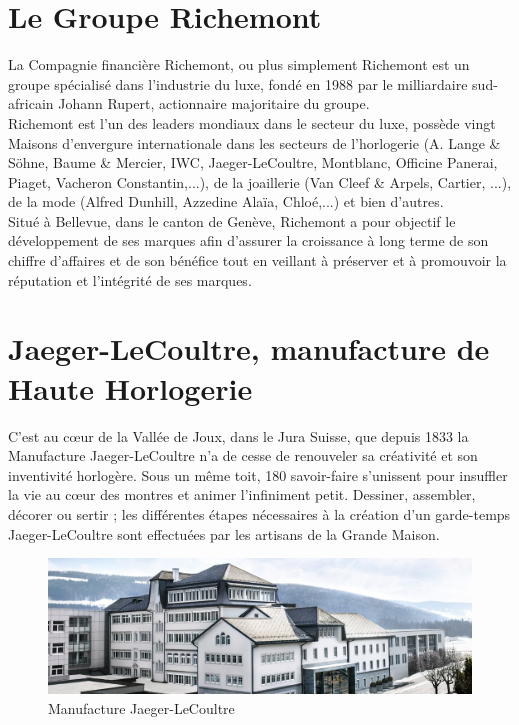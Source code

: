 \section{Le Groupe Richemont}
La Compagnie financière Richemont, ou plus simplement Richemont est un groupe spécialisé dans l'industrie du luxe, fondé en 1988 par le milliardaire sud-africain Johann Rupert, actionnaire majoritaire du groupe. \\

Richemont est l’un des leaders mondiaux dans le secteur du luxe, possède vingt Maisons d’envergure internationale dans les secteurs de l'horlogerie (A. Lange \& Söhne, Baume \& Mercier, IWC, Jaeger-LeCoultre, Montblanc, Officine Panerai, Piaget, Vacheron Constantin,...), de la joaillerie (Van Cleef \& Arpels, Cartier, ...), de la mode (Alfred Dunhill, Azzedine Alaïa, Chloé,...) et bien d'autres. \\

Situé à Bellevue, dans le canton de Genève, Richemont a pour objectif le développement de ses marques afin d'assurer la croissance à long terme de son chiffre d'affaires et de son bénéfice tout en veillant à préserver et à promouvoir la réputation et l'intégrité de ses marques.

\section{Jaeger-LeCoultre, manufacture de Haute Horlogerie}
C'est au cœur de la Vallée de Joux, dans le Jura Suisse, que depuis 1833 la Manufacture Jaeger-LeCoultre n'a de cesse de renouveler sa créativité et son inventivité horlogère. Sous un même toit, 180 savoir-faire s'unissent pour insuffler la vie au cœur des montres et animer l'infiniment petit. Dessiner, assembler, décorer ou sertir ; les différentes étapes nécessaires à la création d'un garde-temps Jaeger-LeCoultre sont effectuées par les artisans de la Grande Maison. \\

\begin{figure}[ht]
    \centering
    \includegraphics[width=\textwidth]{images/manufacture.jpg}
    \caption{Manufacture Jaeger-LeCoultre}
    \label{fig:manufacture}
\end{figure}

